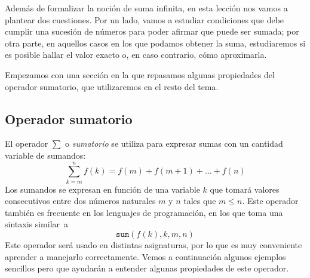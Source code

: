 Además de formalizar la noción de suma infinita, en esta lección nos vamos a plantear dos cuestiones. Por un lado, vamos a estudiar condiciones que debe cumplir una sucesión de números para poder afirmar que puede ser sumada; por otra parte, en aquellos casos en los que podamos obtener la suma, estudiaremos si es posible hallar el valor exacto o, en caso contrario, cómo aproximarla.

Empezamos con una sección en la que repasamos algunas propiedades del operador sumatorio, que utilizaremos en el resto del tema.

\subsection{Operador sumatorio}

El operador $\displaystyle\sum$ o \emph{sumatorio} se utiliza para expresar sumas con un cantidad variable de sumandos:
\[
\sum_{k=m}^n f(k) = f(m)+f(m+1)+\dots+f(n)
\]
Los sumandos se expresan en función de una variable $k$ que tomará valores consecutivos entre dos números naturales $m$ y $n$ tales que $m\le n$.
Este operador también es frecuente en los lenguajes de programación, en los que toma una sintaxis
similar~a
\[
\mathtt{sum}(f(k),k,m,n)
\]
Este operador será usado en distintas asignaturas, por lo que es muy conveniente aprender a manejarlo correctamente.
Vemos a continuación algunos ejemplos sencillos pero que ayudarán a entender algunas propiedades de este operador.
%
